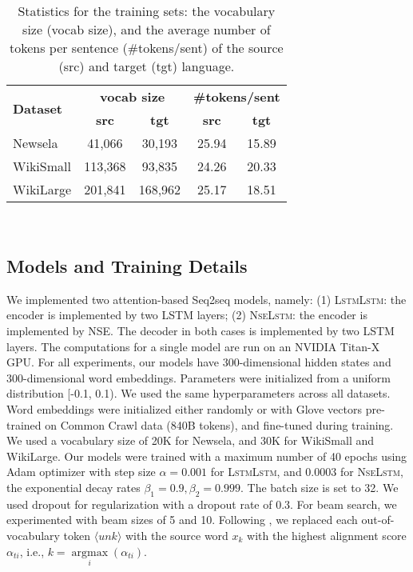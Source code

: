 \documentclass[11pt,a4paper]{article}
\DeclareMathOperator*{\argmax}{argmax}
\begin{document}
\begin{table}[h!]
\centering
\begin{adjustbox}{max width=0.45\textwidth}
\begin{tabular}{| l | c c| c c|} 
 \hline
\multirow{2}{*}{\textbf{Dataset}}  & \multicolumn{2}{|c|}{\textbf{vocab size}} & \multicolumn{2}{|c|}{\textbf{\#tokens/sent}}\\
\cline{2-5}
  & \textbf{src} &\textbf{tgt} &\textbf{src} &\textbf{tgt}\\[0.2ex] 
 \hline\hline
Newsela & 41,066& 30,193& 25.94& 15.89\\  
 WikiSmall & 113,368& 93,835& 24.26& 20.33\\ 
 WikiLarge & 201,841& 168,962& 25.17& 18.51\\ 
 \hline 
\end{tabular}\end{adjustbox}
\\[3mm]
\caption{Statistics for the training sets:  the vocabulary size (vocab size), and the average number of tokens per sentence (\#tokens/sent) of the source (src) and target (tgt) language.}
\label{tbl1}
\vspace*{-3mm}
\end{table}

\subsection{Models and Training Details}
We implemented two attention-based Seq2seq models, namely: (1) \textsc{LstmLstm}: the encoder is implemented by two LSTM layers; (2) \textsc{NseLstm}: the encoder is implemented by NSE. The decoder in both cases is implemented by two LSTM layers. The computations for a single model are run on an NVIDIA Titan-X GPU. For all experiments, our models have 300-dimensional hidden states and 300-dimensional word embeddings. Parameters were initialized from a uniform distribution [-0.1, 0.1). We used the same hyperparameters across all datasets. Word embeddings were initialized either randomly or with Glove vectors \cite{Pennington:14} pre-trained on Common Crawl data (840B tokens), and fine-tuned during training. We used a vocabulary size of 20K for Newsela, and 30K for WikiSmall and WikiLarge. Our models were trained with a maximum number of 40 epochs using Adam optimizer \cite{Kingma:15} with step size $\alpha = 0.001$ for \textsc{LstmLstm}, and $0.0003$ for \textsc{NseLstm}, the exponential decay rates $\beta_1=0.9,\beta_2=0.999$. The batch size is set to 32. We used dropout \cite{Srivastava:14} for regularization with a dropout rate of 0.3. For beam search, we experimented with beam sizes of 5 and 10. Following \cite{Jean:15}, we replaced each out-of-vocabulary token $\langle unk \rangle$ with the source word $x_k$ with the highest alignment score $\alpha_{ti}$, i.e., $k = \argmax \limits_{i} (\alpha_{ti})$.
\end{document}
